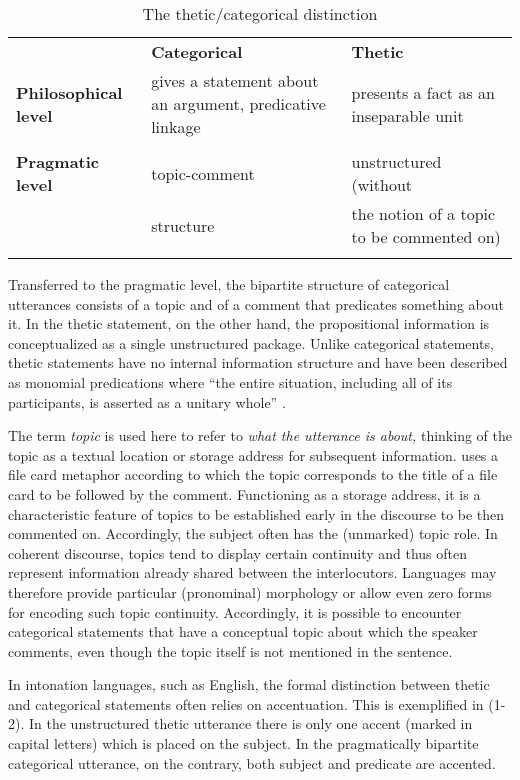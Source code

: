 \documentclass[output=paper]{langsci/langscibook}
\begin{document}
\begin{table}
\caption{The thetic/categorical distinction}
\label{tab:1}

\begin{tabularx}{\textwidth}{XXX}
 & {\textbf{Categorical}} & {\textbf{Thetic} }\\
\lsptoprule
{\textbf{Philosophical level}} & {gives a statement about an argument, predicative linkage}  & {presents a fact as an inseparable unit}\\
\\
{\textbf{Pragmatic level} } & {topic-comment} & {unstructured (without}\\
{\textbf{} } & {structure} & {the notion of a topic to be commented on)}\\
\lspbottomrule
\end{tabularx}
\end{table} 

Transferred to the pragmatic level, the bipartite structure of categorical utterances consists of a topic and of a comment that predicates something about it. In the thetic statement, on the other hand, the propositional information is conceptualized as a single unstructured package. Unlike categorical statements, thetic statements have no internal information structure and have been described as monomial predications where “the entire situation, including all of its participants, is asserted as a unitary whole” \citep[4f]{Sasse1995}. 

  The term \textit{topic} is used here to refer to \textit{what the utterance is about,} thinking of the topic as a textual location or storage address for subsequent information. \citet{Reinhart1982} uses a file card metaphor according to which the topic corresponds to the title of a file card to be followed by the comment. Functioning as a storage address, it is a characteristic feature of topics to be established early in the discourse to be then commented on. Accordingly, the subject often has the (unmarked) topic role. In coherent discourse, topics tend to display certain continuity and thus often represent information already shared between the interlocutors. Languages may therefore provide particular (pronominal) morphology or allow even zero forms for encoding such topic continuity. Accordingly, it is possible to encounter categorical statements that have a conceptual topic about which the speaker comments, even though the topic itself is not mentioned in the sentence. 

  In intonation languages, such as English, the formal distinction between thetic and categorical statements often relies on accentuation. This is exemplified in (1-2). In the unstructured thetic utterance there is only one accent (marked in capital letters) which is placed on the subject. In the pragmatically bipartite categorical utterance, on the contrary, both subject and predicate are accented.
\end{document}
